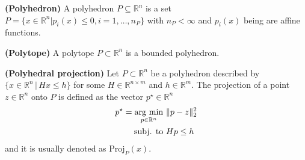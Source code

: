 \begin{definition}
	\textbf{(Polyhedron)}
	A polyhedron $P \subseteq \mathbb{R}^n$ is a set $P = \{x \in \mathbb{R}^n | p_i(x) \leq 0, i=1,\dots,n_P\}$ with $n_P < \infty$ and $p_i(x)$ being are affine functions.
\end{definition}

\begin{definition}
	\textbf{(Polytope)}
	A polytope $P \subset \mathbb{R}^n$ is a bounded polyhedron.
\end{definition}

\begin{definition}
	\textbf{(Polyhedral projection)}
	Let $P \subset \mathbb{R}^n$ be a polyhedron described by $\{x \in \mathbb{R}^n \, | \, H x \leq h \}$ for some $H \in \mathbb{R}^{n \times m}$ and $h \in \mathbb{R}^{m}$. The projection of a point $z \in \mathbb{R}^n$ onto $P$ is defined as the vector $p^\star \in \mathbb{R}^n$
	\begin{align}
		\label{def.pol_proj}
		p^\star = \operatorname*{\arg\,\min}_{p \in \mathbb{R}^n} \ &\Vert p - z \Vert_2^2 \\
		\text{subj. to} \ & H p \leq h \nonumber
	\end{align}
	and it is usually denoted as $\text{Proj}_P(x)$.
\end{definition}



%
%
%
%
